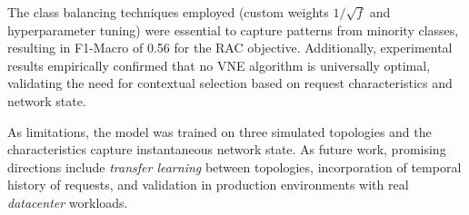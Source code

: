 \documentclass[conference]{IEEEtran}
\begin{document}
The class balancing techniques employed (custom weights $1/\sqrt{f}$ and hyperparameter tuning) were essential to capture patterns from minority classes, resulting in F1-Macro of 0.56 for the RAC objective.
Additionally, experimental results empirically confirmed that no VNE algorithm is universally optimal, validating the need for contextual selection based on request characteristics and network state.

As limitations, the model was trained on three simulated topologies and the characteristics capture instantaneous network state.
As future work, promising directions include \textit{transfer learning} between topologies, incorporation of temporal history of requests, and validation in production environments with real \textit{datacenter} workloads.




\end{document}
